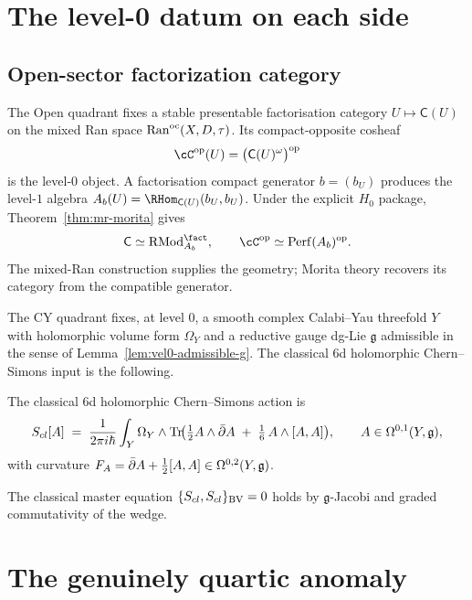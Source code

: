 \section{The level-0 datum on each side}
\label{sec:vel0-datum}

\subsection{Open-sector factorization category}
\label{subsec:thqg-open-sector-factorization-category}

The Open quadrant fixes a stable presentable factorisation category
$U\mapsto\mathsf C(U)$ on the mixed Ran space
$\mathrm{Ran}^{\mathrm{oc}}(X,D,\tau)$.  Its compact-opposite cosheaf
\[
 \cC^\op(U)=\bigl(\mathsf C(U)^\omega\bigr)^\op
\]
is the level-$0$ object.  A factorisation compact generator
$b=(b_U)$ produces the level-$1$ algebra
$A_b(U)=\RHom_{\mathsf C(U)}(b_U,b_U)$.  Under the explicit
$H_0$ package, Theorem~\ref{thm:mr-morita} gives
\[
 \mathsf C\simeq\mathrm{RMod}^{\fact}_{A_b},
 \qquad
 \cC^\op\simeq\mathrm{Perf}(A_b)^\op.
\]
The mixed-Ran construction supplies the geometry; Morita theory
recovers its category from the compatible generator.

The CY quadrant fixes, at level $0$, a smooth complex Calabi--Yau
threefold $Y$ with holomorphic volume form $\Omega_Y$ and a reductive
gauge dg-Lie $\mathfrak{g}$ admissible in the sense of
Lemma~\ref{lem:vel0-admissible-g}. The classical 6d holomorphic
Chern--Simons input is the following.
\begin{definition}
\label{def:vel0-6d-hcs-action}
The classical 6d holomorphic Chern--Simons action is
\begin{equation}
\label{eq:vel0-6d-hcs-action}
S_{cl}[A] \;=\; \frac{1}{2 \pi i \hbar}
\int_Y \Omega_Y \wedge \operatorname{Tr}\!\bigl(
\tfrac{1}{2} A \wedge \bar{\partial} A \;+\; \tfrac{1}{6}\, A \wedge [A, A]
\bigr),
\qquad
A \in \Omega^{0, 1}(Y, \mathfrak{g}),
\end{equation}
with curvature $F_A = \bar{\partial} A + \tfrac{1}{2}[A, A] \in \Omega^{0, 2}(Y, \mathfrak{g})$.
\end{definition}
The classical master equation $\{S_{cl}, S_{cl}\}_{\mathrm{BV}} = 0$ holds by
$\mathfrak{g}$-Jacobi and graded commutativity of the wedge.

\section{The genuinely quartic anomaly}
\label{sec:vel0-quartic}

